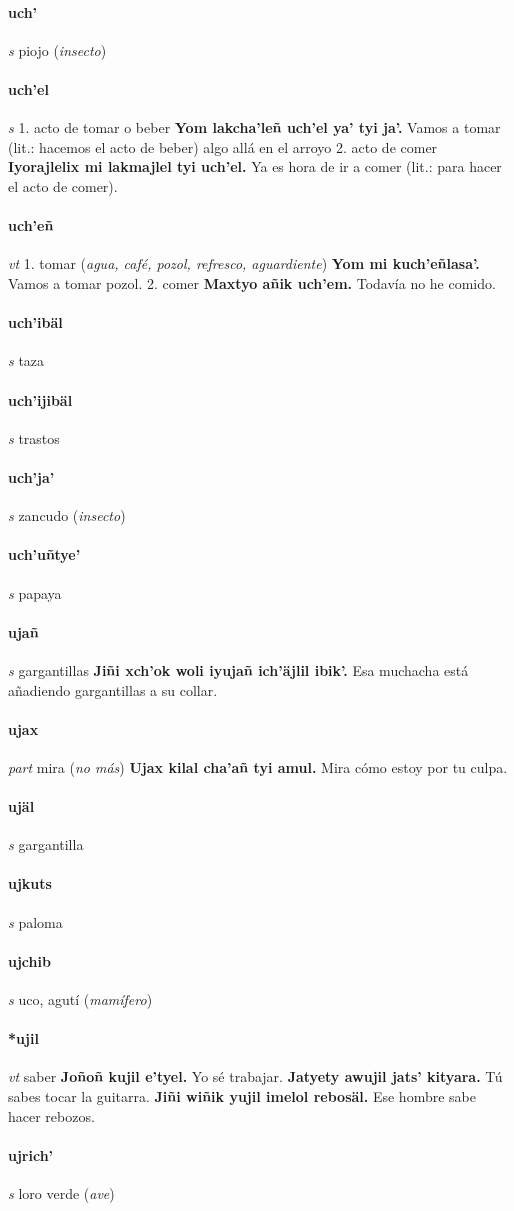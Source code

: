\documentclass{scrbook}
\newcommand{\entry}[1]{\paragraph{#1}}
\newcommand{\onedefinition}[1]{#1.}
\newcommand{\partofspeech}[1]{\textit{#1}}
\newcommand{\spanishtranslation}[1]{#1}
\newcommand{\clarification}[1]{(\textit{#1})}
\newcommand{\cholexample}[1]{\textbf{#1}}
\newcommand{\exampletranslation}[1]{#1}
\begin{document}
\begin{multicols}{2}
\entry{uch'}
\partofspeech{s}
\spanishtranslation{piojo}
\clarification{insecto}

\entry{uch'el}
\partofspeech{s}
\onedefinition{1}
\spanishtranslation{acto de tomar o beber}
\cholexample{Yom lakcha'leñ uch'el ya' tyi ja'.}
\exampletranslation{Vamos a tomar (lit.: hacemos el acto de beber) algo allá en el arroyo}
\onedefinition{2}
\spanishtranslation{acto de comer}
\cholexample{Iyorajlelix mi lakmajlel tyi uch'el.}
\exampletranslation{Ya es hora de ir a comer (lit.: para hacer el acto de comer).}

\entry{uch'eñ}
\partofspeech{vt}
\onedefinition{1}
\spanishtranslation{tomar}
\clarification{agua, café, pozol, refresco, aguardiente}
\cholexample{Yom mi kuch'eñlasa'.}
\exampletranslation{Vamos a tomar pozol.}
\onedefinition{2}
\spanishtranslation{comer}
\cholexample{Maxtyo añik uch'em.}
\exampletranslation{Todavía no he comido.}

\entry{uch'ibäl}
\partofspeech{s}
\spanishtranslation{taza}

\entry{uch'ijibäl}
\partofspeech{s}
\spanishtranslation{trastos}

\entry{uch'ja'}
\partofspeech{s}
\spanishtranslation{zancudo}
\clarification{insecto}

\entry{uch'uñtye'}
\partofspeech{s}
\spanishtranslation{papaya}

\entry{ujañ}
\partofspeech{s}
\spanishtranslation{gargantillas}
\cholexample{Jiñi xch'ok woli iyujañ ich'äjlil ibik'.}
\exampletranslation{Esa muchacha está añadiendo gargantillas a su collar.}

\entry{ujax}
\partofspeech{part}
\spanishtranslation{mira}
\clarification{no más}
\cholexample{Ujax kilal cha'añ tyi amul.}
\exampletranslation{Mira cómo estoy por tu culpa.}

\entry{ujäl}
\partofspeech{s}
\spanishtranslation{gargantilla}

\entry{ujkuts}
\partofspeech{s}
\spanishtranslation{paloma}

\entry{ujchib}
\partofspeech{s}
\spanishtranslation{uco, agutí}
\clarification{mamífero}

\entry{*ujil}
\partofspeech{vt}
\spanishtranslation{saber}
\cholexample{Joñoñ kujil e'tyel.}
\exampletranslation{Yo sé trabajar.}
\cholexample{Jatyety awujil jats' kityara.}
\exampletranslation{Tú sabes tocar la guitarra.}
\cholexample{Jiñi wiñik yujil imelol rebosäl.}
\exampletranslation{Ese hombre sabe hacer rebozos.}

\entry{ujrich'}
\partofspeech{s}
\spanishtranslation{loro verde}
\clarification{ave}


\end{multicols}
\end{document}
